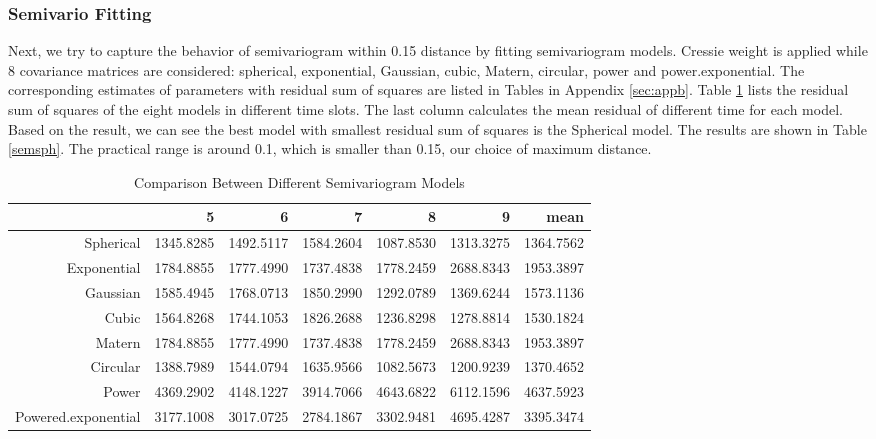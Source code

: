\documentclass[hidelinks,12pt]{article}
\begin{document}
	\subsubsection{Semivario Fitting}
	Next, we try to capture the behavior of semivariogram within 0.15 distance by fitting semivariogram models. Cressie weight is applied while 8 covariance matrices are considered: spherical, exponential, Gaussian, cubic, Matern, circular, power and power.exponential. The corresponding estimates of parameters with residual sum of squares are listed in Tables in Appendix \ref{sec:appb}. Table \ref{tbl:compsem} lists the residual sum of squares of the eight models in different time slots. The last column calculates the mean residual of different time for each model. Based on the result, we can see the best model with smallest residual sum of squares is the Spherical model. The results are shown in Table \ref{semsph}. The practical range is around 0.1, which is smaller than 0.15, our choice of maximum distance.
	\begin{table}[ht]
		\centering
		\caption{Comparison Between Different Semivariogram Models \label{tbl:compsem}}
		\begin{tabular}{rrrrrrr}
			\hline
			& 5 & 6 & 7 & 8 & 9 & mean \\ 
			\hline
			Spherical & 1345.8285 & 1492.5117 & 1584.2604 & 1087.8530 & 1313.3275 & 1364.7562 \\ 
			Exponential & 1784.8855 & 1777.4990 & 1737.4838 & 1778.2459 & 2688.8343 & 1953.3897 \\ 
			Gaussian & 1585.4945 & 1768.0713 & 1850.2990 & 1292.0789 & 1369.6244 & 1573.1136 \\ 
			Cubic & 1564.8268 & 1744.1053 & 1826.2688 & 1236.8298 & 1278.8814 & 1530.1824 \\ 
			Matern & 1784.8855 & 1777.4990 & 1737.4838 & 1778.2459 & 2688.8343 & 1953.3897 \\ 
			Circular & 1388.7989 & 1544.0794 & 1635.9566 & 1082.5673 & 1200.9239 & 1370.4652 \\ 
			Power & 4369.2902 & 4148.1227 & 3914.7066 & 4643.6822 & 6112.1596 & 4637.5923 \\ 
			Powered.exponential & 3177.1008 & 3017.0725 & 2784.1867 & 3302.9481 & 4695.4287 & 3395.3474 \\ 
			\hline
		\end{tabular}
	\end{table}
\end{document}
